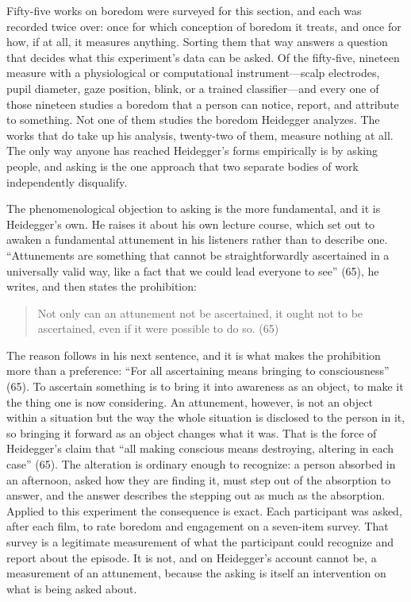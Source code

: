 
Fifty-five works on boredom were surveyed for this section, and each was recorded twice over:
once for which conception of boredom it treats, and once for how, if at all, it measures
anything. Sorting them that way answers a question that decides what this experiment's data can
be asked. Of the fifty-five, nineteen measure with a physiological or computational
instrument---scalp electrodes, pupil diameter, gaze position, blink, or a trained
classifier---and every one of those nineteen studies a boredom that a person can notice, report,
and attribute to something. Not one of them studies the boredom Heidegger analyzes. The works
that do take up his analysis, twenty-two of them, measure nothing at all. The only way anyone
has reached Heidegger's forms empirically is by asking people, and asking is the one approach
that two separate bodies of work independently disqualify.

The phenomenological objection to asking is the more fundamental, and it is Heidegger's own. He
raises it about his own lecture course, which set out to awaken a fundamental attunement in his
listeners rather than to describe one. ``Attunements are something that cannot be straightforwardly ascertained in a universally valid way, like a fact that we could lead everyone to see'' (65), he writes, and then states the
prohibition:

\begin{quote}
Not only can an attunement not be ascertained, it ought not to be ascertained, even if it were possible to do so. (65)
\end{quote}

\noindent The reason follows in his next sentence, and it is what makes the prohibition more
than a preference: ``For all ascertaining means bringing to consciousness'' (65). To ascertain something is to bring it into awareness as an
object, to make it the thing one is now considering. An attunement, however, is not an object
within a situation but the way the whole situation is disclosed to the person in it, so
bringing it forward as an object changes what it was. That is the force of Heidegger's claim
that ``all making conscious means destroying, altering in each case'' (65). The alteration is ordinary enough to recognize: a person absorbed in an
afternoon, asked how they are finding it, must step out of the absorption to answer, and the
answer describes the stepping out as much as the absorption. Applied to this experiment the
consequence is exact. Each participant was asked, after each film, to rate boredom and
engagement on a seven-item survey. That survey is a legitimate measurement of what the
participant could recognize and report about the episode. It is not, and on Heidegger's account
cannot be, a measurement of an attunement, because the asking is itself an
intervention on what is being asked about.

